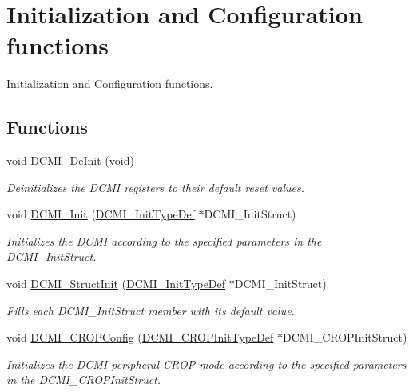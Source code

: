 \hypertarget{group___d_c_m_i___group1}{\section{Initialization and Configuration functions}
\label{group___d_c_m_i___group1}
}


Initialization and Configuration functions.  


\subsection*{Functions}
\begin{DoxyCompactItemize}
\item 
void \hyperlink{group___d_c_m_i___group1_gab8f501f117d5695017e1dc5a611a5015}{D\-C\-M\-I\-\_\-\-De\-Init} (void)
\begin{DoxyCompactList}\small\item\em Deinitializes the D\-C\-M\-I registers to their default reset values. \end{DoxyCompactList}\item 
void \hyperlink{group___d_c_m_i___group1_ga1299076f1459525053ba4f2fa408ed2a}{D\-C\-M\-I\-\_\-\-Init} (\hyperlink{struct_d_c_m_i___init_type_def}{D\-C\-M\-I\-\_\-\-Init\-Type\-Def} $\ast$D\-C\-M\-I\-\_\-\-Init\-Struct)
\begin{DoxyCompactList}\small\item\em Initializes the D\-C\-M\-I according to the specified parameters in the D\-C\-M\-I\-\_\-\-Init\-Struct. \end{DoxyCompactList}\item 
void \hyperlink{group___d_c_m_i___group1_ga268eb4266fe7f294ee748e86f7b8add2}{D\-C\-M\-I\-\_\-\-Struct\-Init} (\hyperlink{struct_d_c_m_i___init_type_def}{D\-C\-M\-I\-\_\-\-Init\-Type\-Def} $\ast$D\-C\-M\-I\-\_\-\-Init\-Struct)
\begin{DoxyCompactList}\small\item\em Fills each D\-C\-M\-I\-\_\-\-Init\-Struct member with its default value. \end{DoxyCompactList}\item 
void \hyperlink{group___d_c_m_i___group1_ga3bd4eb06314ed06dcb71ee91391b7ec4}{D\-C\-M\-I\-\_\-\-C\-R\-O\-P\-Config} (\hyperlink{struct_d_c_m_i___c_r_o_p_init_type_def}{D\-C\-M\-I\-\_\-\-C\-R\-O\-P\-Init\-Type\-Def} $\ast$D\-C\-M\-I\-\_\-\-C\-R\-O\-P\-Init\-Struct)
\begin{DoxyCompactList}\small\item\em Initializes the D\-C\-M\-I peripheral C\-R\-O\-P mode according to the specified parameters in the D\-C\-M\-I\-\_\-\-C\-R\-O\-P\-Init\-Struct. \end{DoxyCompactList}\item 

\end{DoxyCompactItemize}
